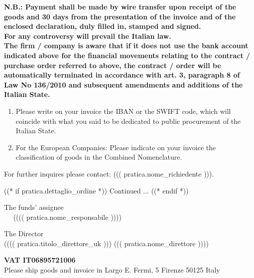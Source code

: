 \documentclass[a4paper,12pt]{letter}
\begin{document}
{\tiny\bf N.B.:
Payment shall be made by wire transfer upon receipt of the goods and 30 days from the presentation of the invoice
and of the enclosed declaration, duly filled in, stamped and signed. \\
For any controversy will prevail the Italian law. \\
The firm / company is aware that if it does not use the bank account indicated above for the financial movements
relating to the contract / purchase order referred to above, the contract / order will be automatically terminated in
accordance with art. 3, paragraph 8 of Law No 136/2010 and subsequent amendments and additions of the Italian
State.
\begin{enumerate}
\item  Please write on your invoice the IBAN or the SWIFT code, which will coincide with what you said to be
dedicated to public procurement of the Italian State.
\item  For the European Companies: Please indicate on your invoice the classification of goods in the Combined
Nomenclature.
\end{enumerate}

For further inquires please contact: ((( pratica.nome_richiedente ))).
}

((* if pratica.dettaglio_ordine *))
\vspace{0.5cm}
\flushright
Continued ...
\newpage
\vspace{2cm}
\quad
((* endif *))

\vspace{1cm}


\begin{minipage}{\textwidth}
\begin{minipage}[t]{8cm}
\begin{center}
The funds' assignee\\
~~ (((( pratica.nome_responsabile )))) ~~ \\
\end{center}
\end{minipage}\hfill\begin{minipage}[t]{8cm}
\begin{center}
The Director \\
({}((( pratica.titolo_direttore_uk ))) ((( pratica.nome_direttore )))) \\
\end{center}
\end{minipage}
\begin{center}
\vspace{14mm}

{\small\bf VAT IT06895721006} \\
{\small Please ship goods and invoice in Largo E. Fermi, 5 Firenze 50125 Italy}
\end{center}
\end{minipage}
\end{document}
